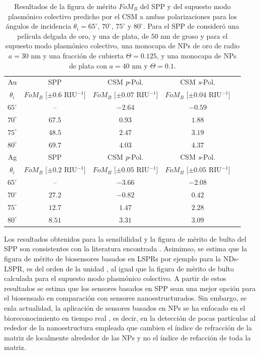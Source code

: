 \begin{table}[h!]
\centering
\caption{Resultados de la figura de mérito $\textit{FoM}_B$ del SPP y del supuesto modo  plasmónico colectivo predicho por el CSM a ambas polarizaciones para los ángulos de incidencia $\theta_i = 65^\circ,\,70^\circ,\, 75^\circ$ y $80^\circ$. Para el SPP de consideró una película delgada de oro, y una de plata, de $50$ nm de groso y para el supuesto modo  plasmónico colectivo, una monocapa de NPs de oro de radio $a=30$ nm y una fracción de cubierta $\Theta=0.125$, y una monocapa de NPs de plata con $a=40$ nm y $\Theta=0.1$.}\vspace*{-.7em}
\label{tab:FOM}\small
\begin{tabular}{c||c||ccc}
Au & SPP  & CSM \emph{p}-Pol. 	& CSM \emph{s}-Pol. \\ 
$\theta_i$ &  $\textit{FoM}_B$ [$\pm 0.6$ RIU$^{-1}$]	  &  $\textit{FoM}_B$ [$\pm 0.07$ RIU$^{-1}$]		&  $\textit{FoM}_B$  [$\pm 0.04$ RIU$^{-1}$]\\ \hline
$65^\circ$ & --			  &	$-2.64$ & $-0.59$\\
$70^\circ$ & $67.5$ &	$0.93$ & $1.88$\\
$75^\circ$ & $48.5$ &	$2.47$ & $3.19$\\
$80^\circ$ & $69.7$ &	$4.03$ & $4.37$\\
\hline \hline
Ag & SPP  & CSM \emph{p}-Pol. 	& CSM \emph{s}-Pol. \\ 
$\theta_i$ &  $\textit{FoM}_B$ [$\pm 0.2$ RIU$^{-1}$]	  &  $\textit{FoM}_B$ [$\pm 0.05$ RIU$^{-1}$]		&  $\textit{FoM}_B$  [$\pm 0.05$ RIU$^{-1}$]\\ \hline
$65^\circ$ & -- 			  &	$-3.66$ & $-2.08$\\
$70^\circ$ & $27.2$ &	$-0.82$ & $0.42$\\
$75^\circ$ & $12.7$ &	$1.47$  & $2.28$\\
$80^\circ$ & $8.51$ &	$3.31$  & $3.09$
\end{tabular}
\end{table}


Los resultados obtenidos para la sensibilidad y la figura de mérito de bulto del SPP son consistentes con la literatura encontrada \cite{estevez2014trends,danilov2018ultra,svedendahl2009refractometric}. Asimimso, se estima que la figura de mérito de biosensores basados en LSPRs por ejemplo para la NDs-LSPR, es del orden de la unidad \cite{svedendahl2009refractometric}, al igual que la figura de mérito de bulto calculada para el supuesto modo  plasmónico colectivo. A partir de estos resultados se estima que los sensores basados en SPP sean una mejor opción para el biosensado en comparación con sensores nanoestructurados. Sin embargo, se enla actualidad, la aplicación de sensores basados en NPs  se ha enfocado en el bioreconocimiento en tiempo real \cite{estevez2014trends,svedendahl2009refractometric}, es decir, en la detección de pocas partículas al rededor de la nanoestructura empleada que cambien el índice de refracción de la matriz de localmente alrededor de las NPs y no el índice de refacción de toda la matriz. 

